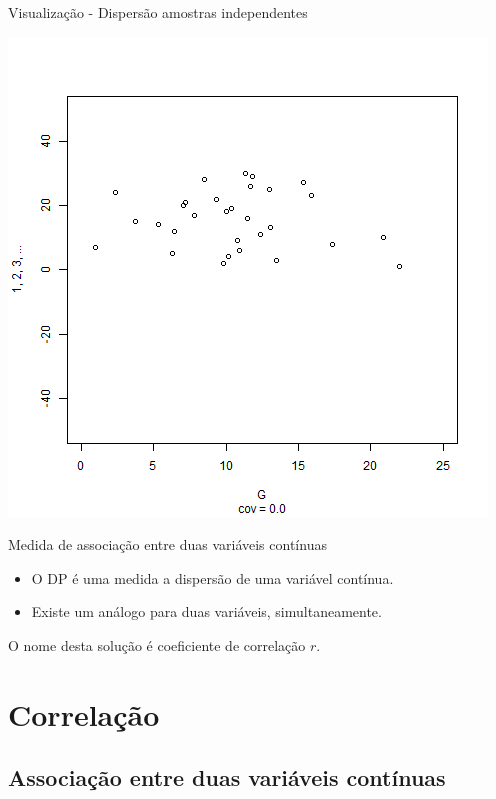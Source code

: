 \documentclass{beamer}
\begin{document}
\begin{frame}{\small Visualização - Dispersão amostras independentes}
  \begin{center}
    \includegraphics[height=.8\textheight]{Cap17/anim-n}
  \end{center}
\end{frame}

\begin{frame}{\small Medida de associação entre duas variáveis contínuas}
  \begin{itemize}
    \small
  \item O DP é uma medida a dispersão de uma variável contínua.
    \bigskip
  \item Existe um análogo para duas variáveis, simultaneamente.
  \end{itemize}

  \vfill
  \begin{block}{}
    O nome desta solução é \alert{coeficiente de correlação} $r$.
  \end{block}
\end{frame}

\section{Correlação}

\subsection[Associação]{Associação entre duas variáveis contínuas}
\end{document}
